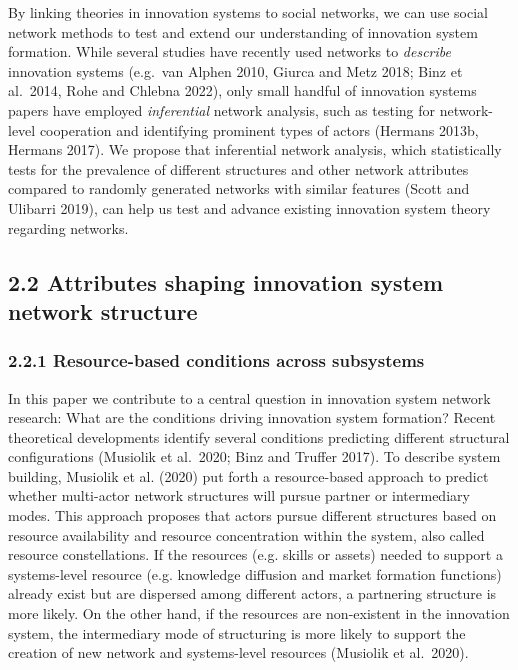 \documentclass[twoside,12pt,final]{ucthesis-CA2012}
\begin{document}
\begin{ucmainmatter}
By linking theories in innovation systems to social networks, we can use
social network methods to test and extend our understanding of
innovation system formation. While several studies have recently used
networks to \emph{describe} innovation systems (e.g.~van Alphen 2010, Giurca
and Metz 2018; Binz et al.~2014, Rohe and Chlebna 2022), only small
handful of innovation systems papers have employed \emph{inferential} network
analysis, such as testing for network-level cooperation and identifying
prominent types of actors (Hermans 2013b, Hermans 2017). We propose that
inferential network analysis, which statistically tests for the
prevalence of different structures and other network attributes compared
to randomly generated networks with similar features (Scott and Ulibarri
2019), can help us test and advance existing innovation system theory
regarding networks.

\hypertarget{attributes-shaping-innovation-system-network-structure}{%
\subsection{2.2 Attributes shaping innovation system network structure}\label{attributes-shaping-innovation-system-network-structure}}

\hypertarget{resource-based-conditions-across-subsystems}{%
\subsubsection{2.2.1 Resource-based conditions across subsystems}\label{resource-based-conditions-across-subsystems}}

In this paper we contribute to a central question in innovation system
network research: What are the conditions driving innovation system
formation? Recent theoretical developments identify several conditions
predicting different structural configurations (Musiolik et al.~2020;
Binz and Truffer 2017). To describe system building, Musiolik et al.
(2020) put forth a resource-based approach to predict whether
multi-actor network structures will pursue partner or intermediary
modes. This approach proposes that actors pursue different structures
based on resource availability and resource concentration within the
system, also called \textquotesingle resource constellations.\textquotesingle{} If the resources (e.g.
skills or assets) needed to support a systems-level resource (e.g.
knowledge diffusion and market formation functions) already exist but
are dispersed among different actors, a partnering structure is more
likely. On the other hand, if the resources are non-existent in the
innovation system, the intermediary mode of structuring is more likely
to support the creation of new network and systems-level resources
(Musiolik et al.~2020).


\end{ucmainmatter}
\end{document}
